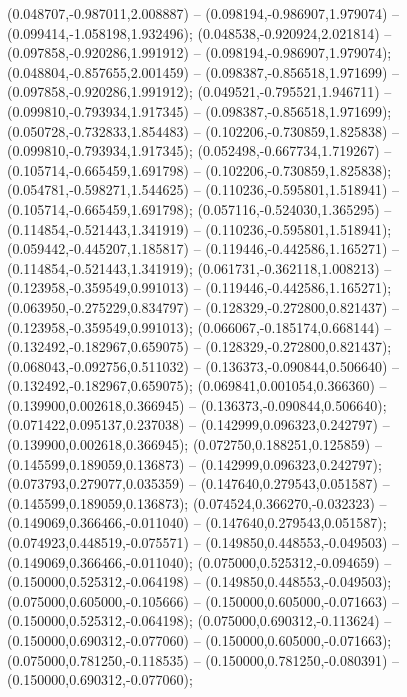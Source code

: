  (0.048707,-0.987011,2.008887) -- (0.098194,-0.986907,1.979074) -- (0.099414,-1.058198,1.932496);
 (0.048538,-0.920924,2.021814) -- (0.097858,-0.920286,1.991912) -- (0.098194,-0.986907,1.979074);
 (0.048804,-0.857655,2.001459) -- (0.098387,-0.856518,1.971699) -- (0.097858,-0.920286,1.991912);
 (0.049521,-0.795521,1.946711) -- (0.099810,-0.793934,1.917345) -- (0.098387,-0.856518,1.971699);
 (0.050728,-0.732833,1.854483) -- (0.102206,-0.730859,1.825838) -- (0.099810,-0.793934,1.917345);
 (0.052498,-0.667734,1.719267) -- (0.105714,-0.665459,1.691798) -- (0.102206,-0.730859,1.825838);
 (0.054781,-0.598271,1.544625) -- (0.110236,-0.595801,1.518941) -- (0.105714,-0.665459,1.691798);
 (0.057116,-0.524030,1.365295) -- (0.114854,-0.521443,1.341919) -- (0.110236,-0.595801,1.518941);
 (0.059442,-0.445207,1.185817) -- (0.119446,-0.442586,1.165271) -- (0.114854,-0.521443,1.341919);
 (0.061731,-0.362118,1.008213) -- (0.123958,-0.359549,0.991013) -- (0.119446,-0.442586,1.165271);
 (0.063950,-0.275229,0.834797) -- (0.128329,-0.272800,0.821437) -- (0.123958,-0.359549,0.991013);
 (0.066067,-0.185174,0.668144) -- (0.132492,-0.182967,0.659075) -- (0.128329,-0.272800,0.821437);
 (0.068043,-0.092756,0.511032) -- (0.136373,-0.090844,0.506640) -- (0.132492,-0.182967,0.659075);
 (0.069841,0.001054,0.366360) -- (0.139900,0.002618,0.366945) -- (0.136373,-0.090844,0.506640);
 (0.071422,0.095137,0.237038) -- (0.142999,0.096323,0.242797) -- (0.139900,0.002618,0.366945);
 (0.072750,0.188251,0.125859) -- (0.145599,0.189059,0.136873) -- (0.142999,0.096323,0.242797);
 (0.073793,0.279077,0.035359) -- (0.147640,0.279543,0.051587) -- (0.145599,0.189059,0.136873);
 (0.074524,0.366270,-0.032323) -- (0.149069,0.366466,-0.011040) -- (0.147640,0.279543,0.051587);
 (0.074923,0.448519,-0.075571) -- (0.149850,0.448553,-0.049503) -- (0.149069,0.366466,-0.011040);
 (0.075000,0.525312,-0.094659) -- (0.150000,0.525312,-0.064198) -- (0.149850,0.448553,-0.049503);
 (0.075000,0.605000,-0.105666) -- (0.150000,0.605000,-0.071663) -- (0.150000,0.525312,-0.064198);
 (0.075000,0.690312,-0.113624) -- (0.150000,0.690312,-0.077060) -- (0.150000,0.605000,-0.071663);
 (0.075000,0.781250,-0.118535) -- (0.150000,0.781250,-0.080391) -- (0.150000,0.690312,-0.077060);
